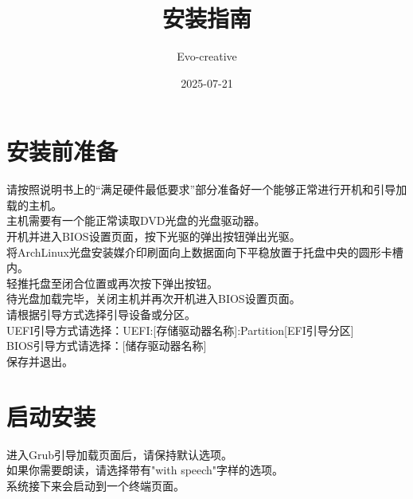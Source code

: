 \documentclass[a4paper,12pt]{article}
\title{\large\color{titlecolor}安装指南}
\author{\color{titlecolor}Evo-creative}
\date{\color{titlecolor}2025-07-21}
\begin{document}
\maketitle

\section{安装前准备}
请按照说明书上的“满足硬件最低要求”部分准备好一个能够正常进行开机和引导加载的主机。\\
主机需要有一个能正常读取DVD光盘的光盘驱动器。\\
开机并进入BIOS设置页面，按下光驱的弹出按钮弹出光驱。\\
将ArchLinux光盘安装媒介印刷面向上数据面向下平稳放置于托盘中央的圆形卡槽内。\\
轻推托盘至闭合位置或再次按下弹出按钮。\\
待光盘加载完毕，关闭主机并再次开机进入BIOS设置页面。\\
请根据引导方式选择引导设备或分区。\\
UEFI引导方式请选择：UEFI:[存储驱动器名称]:Partition[EFI引导分区]\\
BIOS引导方式请选择：[储存驱动器名称]\\
保存并退出。\\

\section{启动安装}
进入Grub引导加载页面后，请保持默认选项。\\
如果你需要朗读，请选择带有"with speech"字样的选项。\\
系统接下来会启动到一个终端页面。\\
\end{document}
